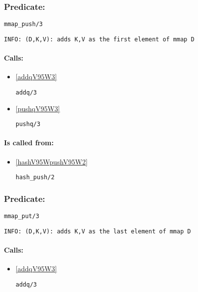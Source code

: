 \subsubsection{Predicate:} \label{mmapV95WpushV95W3}

\begin{verbatim}
mmap_push/3
\end{verbatim}

{\small \begin{verbatim}
INFO: (D,K,V): adds K,V as the first element of mmap D

\end{verbatim}}
\paragraph{Calls:} 
\begin{itemize}
\item \ref{addqV95W3} 
\begin{verbatim}
addq/3
\end{verbatim}

\item \ref{pushqV95W3} 
\begin{verbatim}
pushq/3
\end{verbatim}

\end{itemize}
\paragraph{Is called from:} 
\begin{itemize}
\item \ref{hashV95WpushV95W2} 
\begin{verbatim}
hash_push/2
\end{verbatim}

\end{itemize}

\subsubsection{Predicate:} \label{mmapV95WputV95W3}

\begin{verbatim}
mmap_put/3
\end{verbatim}

{\small \begin{verbatim}
INFO: (D,K,V): adds K,V as the last element of mmap D

\end{verbatim}}
\paragraph{Calls:} 
\begin{itemize}
\item \ref{addqV95W3} 
\begin{verbatim}
addq/3
\end{verbatim}

\end{itemize}

